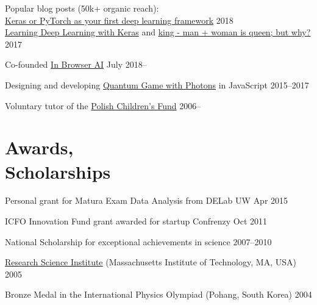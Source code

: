 \documentclass[margin,line]{resume}
\begin{document}
\begin{resume}
    \begin{list2}
      \item Popular blog posts (50k+ organic reach):\\
      \href{https://deepsense.ai/keras-or-pytorch/}{Keras or PyTorch as your first deep learning framework} \hfill {2018}\\
      \href{http://p.migdal.pl/2017/04/30/teaching-deep-learning.html}{Learning Deep Learning with Keras} and \href{http://p.migdal.pl/2017/01/06/king-man-woman-queen-why.html}{king - man + woman is queen; but why?} \hfill {2017}
        \item Co-founded \href{https://inbrowser.ai/}{In Browser AI} \hfill {July 2018--}
        \item Designing and developing \href{http://quantumgame.io/}{Quantum Game with Photons} in JavaScript \hfill {2015--2017}
        \item Voluntary tutor of the \href{http://crastina.se/gifted-children-in-poland-by-piotr-migdal/}{Polish Children's Fund} \hfill { 2006--}
    \end{list2}


    \section{\mysidestyle Awards,\\Scholarships\\}
    \begin{list2}
        \item Personal grant for Matura Exam Data Analysis from DELab UW \hfill {Apr 2015}
    	\item ICFO Innovation Fund grant awarded for startup Confrenzy \hfill { Oct 2011}
        \item National Scholarship for exceptional achievements in science \hfill {2007--2010}
        \item \href{http://www.cee.org/research-science-institute}{Research Science Institute} (Massachusetts Institute of Technology, MA, USA) \hfill { 2005}
        \item Bronze Medal in the International Physics Olympiad (Pohang, South Korea) \hfill { 2004}
    \end{list2}


\end{resume}
\end{document}
